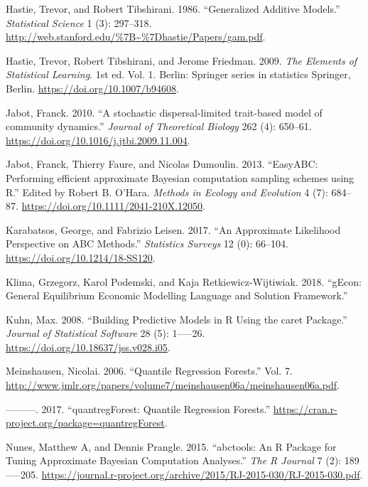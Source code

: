 \documentclass[]{article}
\begin{document}
\leavevmode\hypertarget{ref-Hastie1986}{}%
Hastie, Trevor, and Robert Tibshirani. 1986. ``Generalized Additive Models.'' \emph{Statistical Science} 1 (3): 297--318. \url{http://web.stanford.edu/\%7B~\%7Dhastie/Papers/gam.pdf}.

\leavevmode\hypertarget{ref-friedman_elements_2001}{}%
Hastie, Trevor, Robert Tibshirani, and Jerome Friedman. 2009. \emph{The Elements of Statistical Learning}. 1st ed. Vol. 1. Berlin: Springer series in statistics Springer, Berlin. \url{https://doi.org/10.1007/b94608}.

\leavevmode\hypertarget{ref-Jabot2010}{}%
Jabot, Franck. 2010. ``A stochastic dispersal-limited trait-based model of community dynamics.'' \emph{Journal of Theoretical Biology} 262 (4): 650--61. \url{https://doi.org/10.1016/j.jtbi.2009.11.004}.

\leavevmode\hypertarget{ref-Jabot2013}{}%
Jabot, Franck, Thierry Faure, and Nicolas Dumoulin. 2013. ``EasyABC: Performing efficient approximate Bayesian computation sampling schemes using R.'' Edited by Robert B. O'Hara. \emph{Methods in Ecology and Evolution} 4 (7): 684--87. \url{https://doi.org/10.1111/2041-210X.12050}.

\leavevmode\hypertarget{ref-Karabatsos2017}{}%
Karabatsos, George, and Fabrizio Leisen. 2017. ``An Approximate Likelihood Perspective on ABC Methods.'' \emph{Statistics Surveys} 12 (0): 66--104. \url{https://doi.org/10.1214/18-SS120}.

\leavevmode\hypertarget{ref-Klima2018}{}%
Klima, Grzegorz, Karol Podemski, and Kaja Retkiewicz-Wijtiwiak. 2018. ``gEcon: General Equilibrium Economic Modelling Language and Solution Framework.''

\leavevmode\hypertarget{ref-Kuhn2008}{}%
Kuhn, Max. 2008. ``Building Predictive Models in R Using the caret Package.'' \emph{Journal of Statistical Software} 28 (5): 1-----26. \url{https://doi.org/10.18637/jss.v028.i05}.

\leavevmode\hypertarget{ref-Meinshausen2006}{}%
Meinshausen, Nicolai. 2006. ``Quantile Regression Forests.'' Vol. 7. \url{http://www.jmlr.org/papers/volume7/meinshausen06a/meinshausen06a.pdf}.

\leavevmode\hypertarget{ref-Meinshausen2017}{}%
---------. 2017. ``quantregForest: Quantile Regression Forests.'' \url{https://cran.r-project.org/package=quantregForest}.

\leavevmode\hypertarget{ref-Nunes2015}{}%
Nunes, Matthew A, and Dennis Prangle. 2015. ``abctools: An R Package for Tuning Approximate Bayesian Computation Analyses.'' \emph{The R Journal} 7 (2): 189-----205. \url{https://journal.r-project.org/archive/2015/RJ-2015-030/RJ-2015-030.pdf}.
\end{document}
